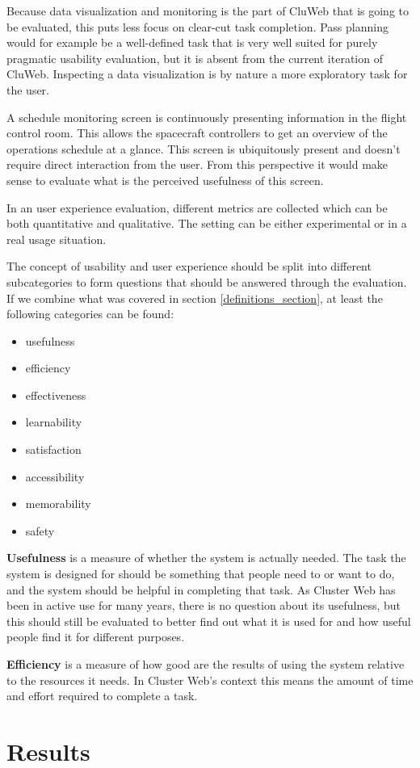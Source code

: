 Because data visualization and monitoring is the part of CluWeb that is going to be evaluated, this puts less focus on clear-cut task completion. Pass planning would for example be a well-defined task that is very well suited for purely pragmatic usability evaluation, but it is absent from the current iteration of CluWeb. Inspecting a data visualization is by nature a more exploratory task for the user.

A schedule monitoring screen is continuously presenting information in the flight control room. This allows the spacecraft controllers to get an overview of the operations schedule at a glance. This screen is ubiquitously present and doesn't require direct interaction from the user. From this perspective it would make sense to evaluate what is the perceived usefulness of this screen.

In an user experience evaluation, different metrics are collected which can be both quantitative and qualitative. The setting can be either experimental or in a real usage situation. 

The concept of usability and user experience should be split into different subcategories to form questions that should be answered through the evaluation. If we combine what was covered in section \ref{definitions_section}, at least the following categories can be found:
\begin{itemize}
\item usefulness
\item efficiency
\item effectiveness
\item learnability
\item satisfaction
\item accessibility
\item memorability
\item safety
\end{itemize}

\cite{rubin2008handbook, bevanevaluation, albert2013measuring}

\textbf{Usefulness} is a measure of whether the system is actually needed. The task the system is designed for should be something that people need to or want to do, and the system should be helpful in completing that task. As Cluster Web has been in active use for many years, there is no question about its usefulness, but this should still be evaluated to better find out what it is used for and how useful people find it for different purposes.

\textbf{Efficiency} is a measure of how good are the results of using the system relative to the resources it needs. In Cluster Web's context this means the amount of time and effort required to complete a task. 

\cite{bevanevaluation}

\cite{albert2013measuring}



\section{Results}
